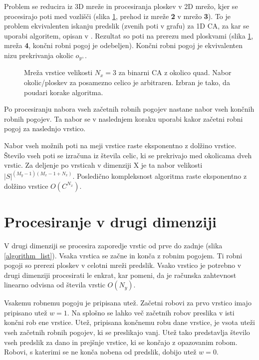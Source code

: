 \documentclass[12pt,a4paper,openany,twoside]{book}
\begin{document}
Problem se reducira iz 3D mreže in procesiranja ploskev v
2D mrežo, kjer se procesirajo poti med vozlišči (slika \ref{algorithm_line},
prehod iz mreže \textbf{2} v mrežo \textbf{3}). To je problem ekvivalenten iskanju predslik
(zvenih poti v grafu) za 1D CA, za kar se uporabi algoritem, opisan v \cite{JerasDobnikar2007}.
Rezultat so poti na prerezu med ploskvami (slika \ref{algorithm_line}, mreža \textbf{4},
končni robni pogoj je odebeljen).
Končni robni pogoj je ekvivalenten nizu prekrivanja okolic \(o_{y^+}\).

\begin{figure}[htb]
\centerline{}
\caption[Algoritem procesiranja vrstice.]{Mreža vrstice velikosti \(N_x=3\) za binarni CA z okolico quad.
Nabor okolic/ploskev za posamezno celico je arbitraren. Izbran je tako, da poudari korake algoritma.}
\label{algorithm_line}
\end{figure}

Po procesiranju nabora vseh začetnih robnih pogojev nastane nabor vseh končnih robnih pogojev.
Ta nabor se v naslednjem koraku uporabi kakor začetni robni pogoj za naslednjo vrstico.

Nabor vseh možnih poti na meji vrstice raste eksponentno z dolžino vrstice.
Število vseh poti se izračuna iz števila celic, ki se prekrivajo med okolicama dveh vrstic.
Za deljenje po vrsticah v dimenziji X je ta nabor velikosti \( |S|^{(M_y-1)(M_x-1+N_x)} \).
Posledično kompleksnost algoritma raste eksponentno z dolžino vrstice \(O(C^{N_x})\).

\section{Procesiranje v drugi dimenziji}

V drugi dimenziji se procesira zaporedje vrstic od prve do zadnje (slika \ref{algorithm_list}).
Vsaka vrstica se začne in konča z robnim pogojem.
Ti robni pogoji so prerezi ploskev v celotni mreži predslik.
Vsako vrstico je potrebno v drugi dimenziji procesirati le enkrat, kar pomeni,
da je računska zahtevnost linearno odvisna od števila vrstic \(O(N_y)\).

Vsakemu robnemu pogoju je pripisana utež. Začetni robovi za prvo vrstico imajo pripisano utež \(w=1\).
Na splošno se lahko več začetnih robov preslika v isti končni rob ene vrstice.
Utež, pripisana končnemu robu dane vrstice, je vsota uteži vseh začetnih robnih pogojev, ki se preslikajo vanj.
Utež tako predstavlja število vseh predslik za dano in prejšnje vrstice, ki se končajo z opazovanim robom.
Robovi, s katerimi se ne konča nobena od predslik, dobijo utež \(w=0\).
\end{document}
